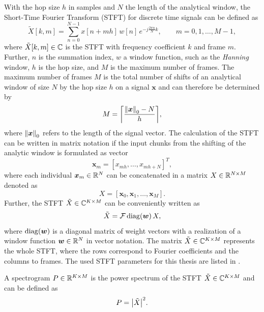 With the hop size $h$ in samples and $N$ the length of the analytical window, the Short-Time Fourier Transform (STFT) for discrete time signals can be defined as
\begin{equation}\label{eq:signal_spec_stft}
  \tilde{X}[k, m] = \sum_{n=0}^{N-1} x[n + m h] \, w[n] \, e^{-j\frac{2 \pi n}{N}k}, \qquad m = 0, 1, \dots, M - 1,
\end{equation}
where $\tilde{X}[k, m] \in \mathbb{C}$ is the STFT with frequency coefficient $k$ and frame $m$.
Further, $n$ is the summation index, $w$ a window function, such as the \emph{Hanning} window, $h$ is the hop size, and $M$ is the maximum number of frames.
The maximum number of frames $M$ is the total number of shifts of an analytical window of size $N$ by the hop size $h$ on a signal $\bm{x}$ and can therefore be determined by
\begin{equation}\label{eq:signal_spec_hop}
  M = \ceil*{\frac{\norm{\bm{x}}_0-N}{h}},
\end{equation}
where $\norm{\bm{x}}_0$ refers to the length of the signal vector.
The calculation of the STFT can be written in matrix notation if the input chunks from the shifting of the analytic window is formulated as vector
\begin{equation}
  \bm{x}_m = [x_{m h}, \dots, x_{m h+N}]^T,
\end{equation}
where each individual $\bm{x}_m \in \mathbb{R}^N$ can be concatenated in a matrix $X \in \mathbb{R}^{N \times M}$ denoted as
\begin{equation}
  X = [\bm{x}_0, \bm{x}_1, \dots, \bm{x}_M].
\end{equation}
Further, the STFT $\tilde{X} \in \mathbb{C}^{K \times M}$ can be conveniently written as
\begin{equation}\label{eq:signal_spec_stft_matrix}
  \tilde{X} = \mathcal{F} \mathop{\mathrm{diag}(\bm{w})} X,
\end{equation}
where $\mathop{\mathrm{diag}(\bm{w})}$ is a diagonal matrix of weight vectors with a realization of a window function $\bm{w} \in \mathbb{R}^N$ in vector notation.
The matrix $\tilde{X} \in \mathbb{C}^{K \times M}$ represents the whole STFT, where the rows correspond to Fourier coefficients and the columns to frames.
The used STFT parameters for this thesis are listed in .

A spectrogram $P \in \mathbb{R}^{K \times M}$ is the power spectrum of the STFT $\tilde{X} \in \mathbb{C}^{K \times M}$ and can be defined as
\begin{equation}\label{eq:signal_spec_spec}
  P = \abs{\tilde{X}}^2.
\end{equation}
